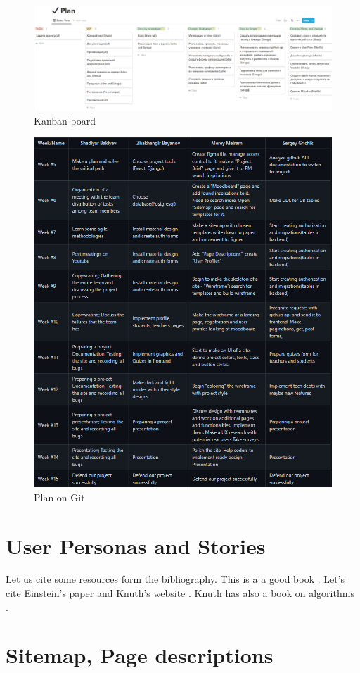 \begin{figure}[!htb]
    \centering
    \includegraphics[scale=0.5]{Kanbanbrd.png}
    \caption{Kanban board}
    \label{fig:knbrd}
\end{figure}
\begin{figure}[t]
    \centering
    \includegraphics[scale=0.5]{weeksplan.png}
    \caption{Plan on Git}
    \label{fig:weeksplan}
\end{figure}

\newpage
\section{User Personas and Stories}

Let us cite some resources form the  bibliography. This is a a good book \cite{dirac}. Let's cite Einstein's paper \cite{einstein} and Knuth's website \cite{knuthwebsite}. Knuth has also a book on algorithms \cite{knuth-fa}.

\section{Sitemap, Page descriptions}